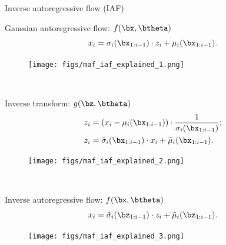 \begin{frame}{Inverse autoregressive flow (IAF)}

	\begin{minipage}[t]{0.65\columnwidth}
		\begin{block}{Gaussian autoregressive flow: $f(\bx, \btheta)$}
			\[
			x_i = \sigma_i (\bx_{1:i-1}) \cdot z_i + \mu_i(\bx_{1:i-1}).
			\]
		\end{block}
	\end{minipage}%
	\begin{minipage}[t]{0.35\columnwidth}
		\begin{figure}[h]
			\centering
			\texttt{[image: figs/maf\_iaf\_explained\_1.png]}
		\end{figure}
	\end{minipage} \\
	
	\begin{minipage}[t]{0.65\columnwidth}
		\begin{block}{Inverse transform: $g(\bz, \btheta)$}
			\vspace{-0.5cm}
			\begin{align*}
				z_i &= (x_i - \mu_i(\bx_{1:i-1})) \cdot \frac{1}{\sigma_i (\bx_{1:i-1}) }; \\
				z_i &= \tilde{\sigma}_i (\bx_{1:i-1}) \cdot x_i + \tilde{\mu}_i(\bx_{1:i-1}).
			\end{align*}
			\vspace{-0.4cm}
		\end{block}
	\end{minipage}%
	\begin{minipage}[t]{0.35\columnwidth}
		\begin{figure}[h]
			\centering
			\texttt{[image: figs/maf\_iaf\_explained\_2.png]}
		\end{figure}
	\end{minipage}\\
	\vspace{0.1cm}
	
	\begin{minipage}[t]{0.65\columnwidth}
		\begin{block}{Inverse autoregressive flow: $f(\bx, \btheta)$}
			\[
			x_i = \tilde{\sigma}_i (\bz_{1:i-1}) \cdot z_i + \tilde{\mu}_i(\bz_{1:i-1}).
			\]
		\end{block}
	\end{minipage}%
	\begin{minipage}[t]{0.35\columnwidth}
		\begin{figure}[h]
			\centering
			\texttt{[image: figs/maf\_iaf\_explained\_3.png]}
		\end{figure}
	\end{minipage}
	
\end{frame}
